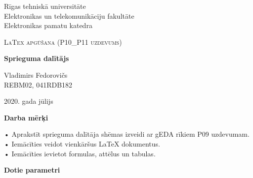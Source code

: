 \documentclass[12pt,a4paper]{report}
\begin{document}
\begin{titlepage}
	\centering
	\large{Rīgas tehniskā universitāte\\Elektronikas un telekomunikāciju fakultāte\\Elektronikas pamatu katedra\\}
	\vspace{4.5cm}
	{\scshape\Large LaTex apgūšana (P10\_P11 uzdevums)\par}
	\vspace{0.5cm}
	{\huge\bfseries Sprieguma dalītājs\\\par}
	\vspace{11cm}

	\begin{flushright}
	    {\Large Vladimirs Fedorovičs\\REBM02, 041RDB182\par}
	\end{flushright}

	\vfill
	{2020. gada jūlijs}
\end{titlepage}

\begin{center}
{\huge\bfseries Darba mērķi\par}
\end{center}
\vspace{0.5cm}
\setlength{\parindent}{0cm}
• Aprakstīt sprieguma dalītāja shēmas izveidi ar gEDA rīkiem P09 uzdevumam.\\
• Iemācīties veidot vienkāršus LaTeX dokumentus.\\
• Iemācīties ievietot formulas, attēlus un tabulas.
\vspace{2cm}


\begin{center}
{\huge\bfseries Dotie parametri\par}
\end{center}

\end{document}
